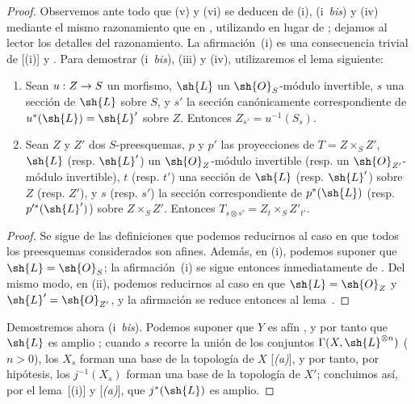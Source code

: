 \documentclass[oneside,10pt]{amsart}
\makeatletter
\newcommand{\ega@arrow}[2]{\mathchoice{#1}{#2}{#2}{#2}}
\renewcommand{\to}{\ega@arrow{\longrightarrow}{\rightarrow}}
\let\EGAOriginalLabel\label
\renewcommand{\label}[1]{\phantomsection\EGAOriginalLabel{#1}}
\makeatother
\begin{document}
\begin{proof}
Observemos ante todo que (v) y (vi) se deducen de (i), (i~\emph{bis}) y (iv) mediante el mismo razonamiento que en , utilizando  en lugar de ;
dejamos al lector los detalles del razonamiento.
La afirmación~(i) es una consecuencia trivial de [(i)] y .
Para demostrar (i~\emph{bis}), (iii) y (iv), utilizaremos el lema siguiente:
  \begin{lemma}[4.6.13.1]
  \label{II.4.6.13.1}
  \begin{enumerate}
    \item[\rm{(i)}] Sean $u:Z\to S$ un morfismo, $\sh{L}$ un $\sh{O}_S$-módulo invertible, $s$ una sección de $\sh{L}$ sobre $S$, y $s'$ la sección canónicamente correspondiente de $u^*(\sh{L})=\sh{L}'$ sobre $Z$.
      Entonces $Z_{s'}=u^{-1}(S_s)$.
    \item[\rm{(ii)}] Sean $Z$ y $Z'$ dos $S$-preesquemas, $p$ y $p'$ las proyecciones de $T=Z\times_S Z'$, $\sh{L}$ \textup{(resp. $\sh{L}'$)} un $\sh{O}_Z$-módulo invertible \textup{(resp.} un $\sh{O}_{Z'}$-módulo invertible\textup{)}, $t$ \textup{(resp. $t'$)} una sección de $\sh{L}$ \textup{(resp. $\sh{L}'$)} sobre $Z$ \textup{(resp. $Z'$)}, y $s$ \textup{(resp. $s'$)} la sección correspondiente de $p^*(\sh{L})$ \textup{(resp. $p'^*(\sh{L}')$)} sobre $Z\times_S Z'$.
      Entonces $T_{s\otimes s'}=Z_t\times_S Z'_{t'}$.
  \end{enumerate}
  \end{lemma}

  \begin{proof}
  Se sigue de las definiciones que podemos reducirnos al caso en que todos los preesquemas considerados son afines.
  Además, en (i), podemos suponer que $\sh{L}=\sh{O}_S$;
  la afirmación~(i) se sigue entonces inmediatamente de .
  Del mismo modo, en (ii), podemos reducirnos al caso en que $\sh{L}=\sh{O}_Z$ y $\sh{L}'=\sh{O}_{Z'}$, y la afirmación se reduce entonces al lema~.
  \end{proof}

Demostremos ahora (i~\emph{bis}).
Podemos suponer que $Y$ es afín , y por tanto que $\sh{L}$ es amplio ;
cuando $s$ recorre la unión de los conjuntos $\Gamma(X,\sh{L}^{\otimes n})$ ($n>0$), los $X_s$ forman una base de la topología de $X$ [\emph{(a)}], y por tanto, por hipótesis, los $j^{-1}(X_s)$ forman una base de la topología de $X'$;
concluimos así, por el lema~[(i)] y [\emph{(a)}], que $j^*(\sh{L})$ es amplio.


\end{proof}
\end{document}
